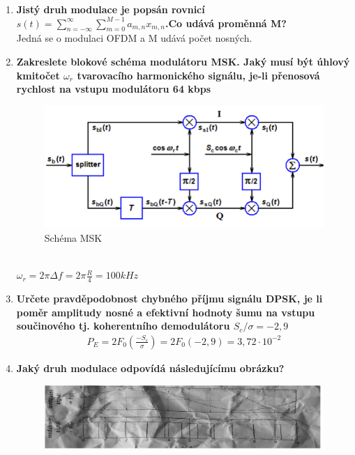 \begin{enumerate}
{    signál je \(f(t) = sin(2\pi \cdot 10^3t)\) [V]}
    \begin{gather*}
        n = \frac{f_n - f_c}{F_{max}} = \frac{10,003\cdot 10^6 - 10\cdot 10^6}{10^3} = 3\\
        S_3 = S_c \left | J_3(\beta) \right | = 5\cdot \left | J_3(5) \right | = 0,68V
    \end{gather*}
    \item \textbf{Jistý druh modulace je popsán rovnicí \(s(t) = \sum_{n = -\infty}^{\infty} \sum_{m=0}^{M-1}a_{m,n}x_{m,n}\).Co udává proměnná
    M?}\\
    Jedná se o modulaci OFDM a M udává počet nosných.
    \item \textbf{Zakreslete blokové schéma modulátoru MSK. Jaký musí být úhlový kmitočet \(\omega_r\)
    tvarovacího harmonického signálu, je-li přenosová rychlost na vstupu modulátoru 64 kbps}\\
    \begin{figure}[h]
        \centering
        \includegraphics[scale = 0.3]{images/MSK.png}
        \caption{Schéma MSK}
    \end{figure}\\
    \(\omega_r = 2\pi\Delta f = 2\pi\frac{R}{4} = 100kHz\)
    \item \textbf{Určete pravděpodobnost chybného příjmu signálu DPSK, je li poměr amplitudy nosné a
    efektivní hodnoty šumu na vstupu součinového tj. koherentního demodulátoru \(S_c/\sigma
    =-2,9\)}
    \begin{gather*}
        P_E = 2F_0(\frac{-S_c}{\sigma}) = 2F_0(-2,9) = 3,72\cdot 10^{-2}
    \end{gather*}
    \item \textbf{Jaký druh modulace odpovídá následujícímu obrázku?}\\
    \begin{figure}[h]
        \centering
        \includegraphics[scale = 0.3]{images/PWMAsy.png}

\end{figure}
\end{enumerate}
